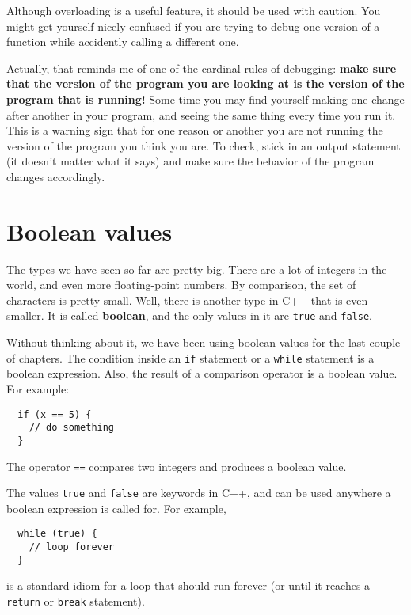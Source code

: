 Although overloading is a useful feature, it should be used with
caution.  You might get yourself nicely confused if you are trying to
debug one version of a function while accidently calling a different
one.

Actually, that reminds me of one of the cardinal rules of debugging:
{\bf make sure that the version of the program you are looking at is
the version of the program that is running!}  Some time you may find
yourself making one change after another in your program, and seeing
the same thing every time you run it.  This is a warning sign that for
one reason or another you are not running the version of the program
you think you are.  To check, stick in an output statement (it
doesn't matter what it says) and make sure the behavior of the
program changes accordingly.

\section{Boolean values}

The types we have seen so far are pretty big.  There are a lot
of integers in the world, and even more floating-point numbers.
By comparison, the set of characters is pretty small.  Well, there
is another type in C++ that is even smaller.  It is called
{\bf boolean}, and the only values in it are
{\tt true} and {\tt false}.

Without thinking about it, we have been using boolean values for the
last couple of chapters.  The condition inside an {\tt if}
statement or a {\tt while} statement is a boolean expression.
Also, the result of a comparison operator is a boolean value.
For example:

\begin{verbatim}
  if (x == 5) {
    // do something
  }
\end{verbatim}
%
The operator {\tt ==} compares two integers and produces a
boolean value.


The values {\tt true} and {\tt false} are keywords in C++,
and can be used anywhere a boolean expression is called for.
For example, 

\begin{verbatim}
  while (true) {
    // loop forever
  }
\end{verbatim}
%
is a standard idiom for a loop that should run forever (or
until it reaches a {\tt return} or {\tt break} statement).

